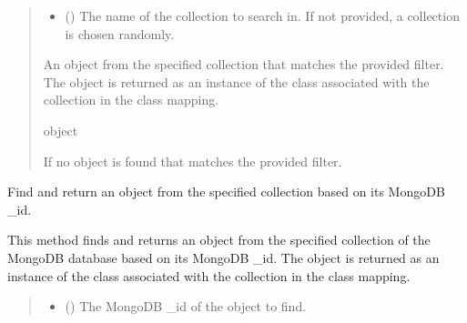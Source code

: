 \documentclass[letterpaper,10pt,english]{sphinxmanual}
\begin{document}
\begin{fulllineitems}
\begin{fulllineitems}
\begin{quote}
\begin{description}
\begin{itemize}
\item {} 
\sphinxAtStartPar
{} (\sphinxstyleliteralemphasis{\sphinxupquote{, }}) \textendash{} The name of the collection to search in. If not provided, a collection is chosen randomly.

\end{itemize}

\sphinxAtStartPar
An object from the specified collection that matches the provided filter. The object is
returned as an instance of the class associated with the collection in the class mapping.

\sphinxAtStartPar
object

\sphinxAtStartPar
{} \textendash{} If no object is found that matches the provided filter.

\end{description}\end{quote}

\end{fulllineitems}


\begin{fulllineitems}
\label{\detokenize{forensicfit.database.database:forensicfit.database.database.Database.find_with_id}}
\pysigstartsignatures
{}
\pysigstopsignatures
\sphinxAtStartPar
Find and return an object from the specified collection based on its MongoDB \_id.

\sphinxAtStartPar
This method finds and returns an object from the specified collection of the MongoDB database
based on its MongoDB \_id. The object is returned as an instance of the class associated with
the collection in the class mapping.
\begin{quote}\begin{description}
\sphinxAtStartPar
{}

\begin{itemize}
\item {} 
\sphinxAtStartPar
{} () \textendash{} The MongoDB \_id of the object to find.


\end{itemize}
\end{description}
\end{quote}
\end{fulllineitems}
\end{fulllineitems}
\end{document}

